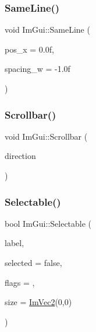 \mbox{\label{namespace_im_gui_a9a01bed1445b5b7edaf0af6a31c08d2c}} 
\subsubsection{\texorpdfstring{Same\+Line()}{SameLine()}}
{\footnotesize\ttfamily void Im\+Gui\+::\+Same\+Line (\begin{DoxyParamCaption}\item[{float}]{pos\+\_\+x = {\ttfamily 0.0f},  }\item[{float}]{spacing\+\_\+w = {\ttfamily -\/1.0f} }\end{DoxyParamCaption})}

\mbox{\label{namespace_im_gui_abf1d7a83c5f0a555bbe7f831b0319c8a}} 
\subsubsection{\texorpdfstring{Scrollbar()}{Scrollbar()}}
{\footnotesize\ttfamily void Im\+Gui\+::\+Scrollbar (\begin{DoxyParamCaption}\item[{\mbox{\hyperlink{imgui__internal_8h_a86d7bb2ee8297d38b131d8ea7e6430c6}{Im\+Gui\+Layout\+Type}}}]{direction }\end{DoxyParamCaption})}

\mbox{\label{namespace_im_gui_af98575238bda183a523df19fb447af60}} 
\subsubsection{\texorpdfstring{Selectable()}{Selectable()}\hspace{0.1cm}{\footnotesize\ttfamily [1/2]}}
{\footnotesize\ttfamily bool Im\+Gui\+::\+Selectable (\begin{DoxyParamCaption}\item[{const char $\ast$}]{label,  }\item[{bool}]{selected = {\ttfamily false},  }\item[{\mbox{\hyperlink{imgui_8h_aab0fe56421d75949dedfbfbbaa674b6b}{Im\+Gui\+Selectable\+Flags}}}]{flags = {},  }\item[{const \mbox{\hyperlink{struct_im_vec2}{Im\+Vec2}} \&}]{size = {\ttfamily \mbox{\hyperlink{struct_im_vec2}{Im\+Vec2}}(0,0)} }\end{DoxyParamCaption})}

